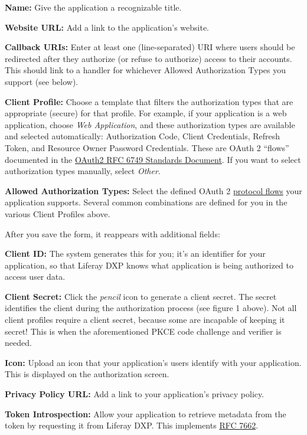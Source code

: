 \textbf{Name:} Give the application a recognizable title.

\textbf{Website URL:} Add a link to the application's website.

\textbf{Callback URIs:} Enter at least one (line-separated) URI where
users should be redirected after they authorize (or refuse to authorize)
access to their accounts. This should link to a handler for whichever
Allowed Authorization Types you support (see below).

\textbf{Client Profile:} Choose a template that filters the
authorization types that are appropriate (secure) for that profile. For
example, if your application is a web application, choose \emph{Web
Application}, and these authorization types are available and selected
automatically: Authorization Code, Client Credentials, Refresh Token,
and Resource Owner Password Credentials. These are OAuth 2 ``flows''
documented in the \href{https://tools.ietf.org/html/rfc6749}{OAuth2 RFC
6749 Standards Document}. If you want to select authorization types
manually, select \emph{Other}.

\textbf{Allowed Authorization Types:} Select the defined OAuth 2
\href{https://tools.ietf.org/html/rfc6749\#section-1.2}{protocol flows}
your application supports. Several common combinations are defined for
you in the various Client Profiles above.

After you save the form, it reappears with additional fields:

\textbf{Client ID:} The system generates this for you; it's an
identifier for your application, so that Liferay DXP knows what
application is being authorized to access user data.

\textbf{Client Secret:} Click the \emph{pencil} icon to generate a
client secret. The secret identifies the client during the authorization
process (see figure 1 above). Not all client profiles require a client
secret, because some are incapable of keeping it secret! This is when
the aforementioned PKCE code challenge and verifier is needed.

\textbf{Icon:} Upload an icon that your application's users identify
with your application. This is displayed on the authorization screen.

\textbf{Privacy Policy URL:} Add a link to your application's privacy
policy.

\textbf{Token Introspection:} Allow your application to retrieve
metadata from the token by requesting it from Liferay DXP. This
implements \href{https://tools.ietf.org/html/rfc7662}{RFC 7662}.

